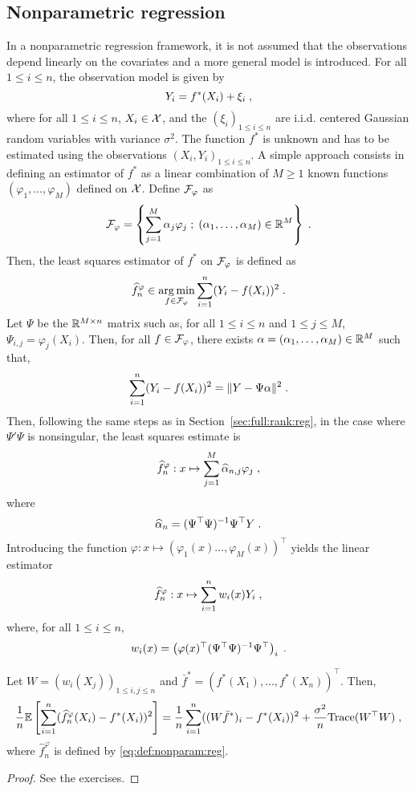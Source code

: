 \subsection{Nonparametric regression}
In a nonparametric regression framework, it is not assumed that the observations depend linearly on the covariates and a more general model is introduced. For all $1\leqslant i\leqslant n$, the observation model is given by
\[
Y_{i}=f^*(X_{i})+\xi_{i}\;,
\]
where for all $1\leqslant i\leqslant n$, $X_i\in\mathcal{X}$, and the $(\xi_{i})_{1\leqslant i \leqslant n}$ are i.i.d. centered Gaussian random variables with variance $\sigma^2$. The function $f^*$ is unknown and has to be estimated using the observations $(X_i,Y_i)_{1\leqslant i\leqslant n}$. A simple approach consists in defining an estimator of $f^*$ as a linear combination of $M\geqslant 1$ known functions $(\varphi_1,\ldots,\varphi_M)$ defined on $\mathcal{X}$. Define $\mathcal{F}_\varphi$ as
\[
\mathcal{F}_\varphi = \left\{\sum_{j=1}^M \alpha_j \varphi_j\;;\; (\alpha_1,\ldots,\alpha_M)\in\mathbb{R}^M\right\}\;.
\]
Then, the least squares estimator of $f^*$ on $\mathcal{F}_\varphi$ is defined as
\[
\widehat f^\varphi_n\in  \argmin_{f \in \calF_\varphi}  \sum_{i=1}^n(Y_i - f(X_i))^2\eqsp.
\]
Let $\Psi$ be the $\mathbb{R}^{M\times n}$ matrix such as, for all $1\leqslant i\leqslant n$ and $1\leqslant j\leqslant M$, $\Psi_{i,j} = \varphi_j(X_i)$. Then, for all $f \in \mathcal{F}_\varphi$, there exists $\alpha = (\alpha_1,\ldots,\alpha_M)\in\mathbb{R}^M$ such that,
\[
 \sum_{i=1}^n(Y_i - f(X_i))^2 = \|Y - \Psi \alpha\|^2\;.
\]
Then, following the same steps as in Section~\ref{sec:full:rank:reg}, in the case where $\Psi' \Psi$ is nonsingular, the least squares estimate is
\begin{equation}
\label{eq:def:nonparam:reg}
\widehat f^\varphi_n: x\mapsto \sum_{j=1}^M \widehat\alpha_{n,j} \varphi_j\;,
\end{equation}
where
\[
\widehat\alpha_{n} = (\Psi^\top \Psi)^{-1}\Psi^\top Y\;.
\]
Introducing the function $\varphi: x\mapsto (\varphi_1(x)\ldots,\varphi_M(x))^\top$ yields the linear estimator 
\[
\widehat f^\varphi_n: x \mapsto \sum_{i = 1}^n w_i(x)Y_i\;,
\]
where, for all $1\leqslant i\leqslant n$,
\[
w_i(x) = \left(\varphi(x)^\top(\Psi^\top\Psi)^{-1}\Psi^\top\right)_i\;.
\]

\begin{shaded}
\begin{proposition}
Let  $W = (w_i(X_j))_{1\leqslant i,j \leqslant n}$ and $\bar f^* = (f^*(X_1),\ldots,f^*(X_n))^\top$. Then,
\[
\frac{1}{n}\mathbb{E}\left[\sum_{i=1}^n(\widehat f^\varphi_n(X_i) - f^*(X_i))^2\right] = \frac{1}{n}\sum_{i=1}^n((W\bar f^*)_i - f^*(X_i))^2 + \frac{\sigma^2}{n}\mathrm{Trace}(W^\top W)\;,
\]
where $\widehat f^\varphi_n$  is defined by \eqref{eq:def:nonparam:reg}.
\end{proposition}
\end{shaded}
\begin{proof}
See the exercises.
\end{proof}
